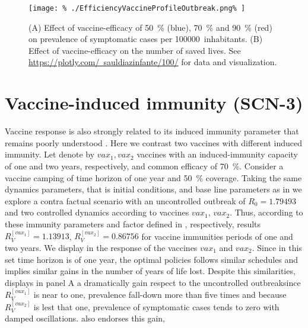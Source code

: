 %
\begin{figure*}[htb]
    \centering
    \texttt{[image: \%
        ./EfficiencyVaccineProfileOutbreak.png\%
    ]}
    \caption[Optimal Vaccination Policy]{
        (A) Effect of vaccine-efficacy of
        \SI{50}{\percent} (blue), \SI{70}{\percent}
        and \SI{90}{\percent} (red) on prevalence
        of symptomatic cases per \SI{100000}{inhabitants}.
        (B) Effect of vaccine-efficacy on the number of saved lives.
        See
        \href{https://plotly.com/~sauldiazinfante/100/%
        }{https://plotly.com/~sauldiazinfante/100/} for data and
        visualization.
    }
    \label{fig:efficiencyvaccineprofileOutbreak}
\end{figure*}

\section*{Vaccine-induced immunity (SCN-3)}
Vaccine response is also strongly related to its induced immunity
\textemdash parameter that remains poorly understood
\cite{Jeyanathan2020}.
Here we contrast two vaccines with different induced immunity. Let
denote by $vax_1, vax_2$ vaccines with an induced-immunity capacity of one and
two years, respectively, and common efficacy of \SI{70}{\percent}. Consider a
vaccine camping of time horizon of one year and \SI{50}{\percent} coverage.
Taking the same dynamics parameters, that is initial conditions, and base
line parameters as in   we explore a
contra factual scenario with an uncontrolled outbreak of
$R_0 = \num{1.79493}$ and two controlled dynamics according to vaccines
$vax_1$, $vax_2$. Thus, according to these immunity parameters and factor
defined in  ,
respectively, results
$R_V^{[vax_1]} = \num{1.13913}$, $R_V^{[vax_2]} = \num{0.86756}$
for vaccine immunities periods of one and two years. We display in
 the response of the
vaccines $vax_1$ and $vax_2$. Since in this set time
horizon is of one year, the optimal policies follows similar schedules and
implies similar gains in the number of years of life lost. Despite this
similarities, 
displays in panel A a dramatically gain respect to the
uncontrolled outbreak\textemdash since
$R_V ^{[vax_1]}$ is near to one, prevalence fall-down more than five times
and because $R_V ^{[vax_2]}$ is lest that one, prevalence of symptomatic
cases tends to zero with damped oscillations.
 also endorses this gain,
